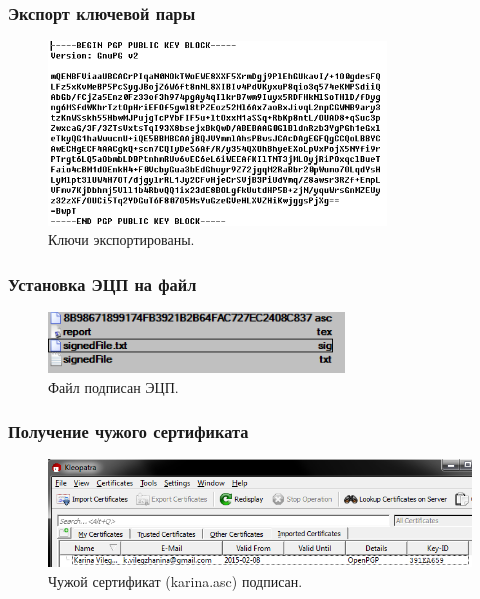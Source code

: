 \documentclass[a4paper, 14pt]{article}				%
\begin{document}
\subsubsection{Экспорт ключевой пары}
\begin{figure}[h!]
\centering
\includegraphics[width=0.8\textwidth]{fig9}
\caption{Ключи экспортированы.}
\end{figure}

\subsubsection{Установка ЭЦП на файл}
\begin{figure}[h!]
\centering
\includegraphics[width=0.7\textwidth]{fig10}
\caption{Файл подписан ЭЦП.}
\end{figure}

\subsubsection{Получение чужого сертификата}
\begin{figure}[h!]
\centering
\includegraphics[width=\textwidth]{fig11}
\caption{Чужой сертификат (karina.asc) подписан.}
\end{figure}
\end{document}
